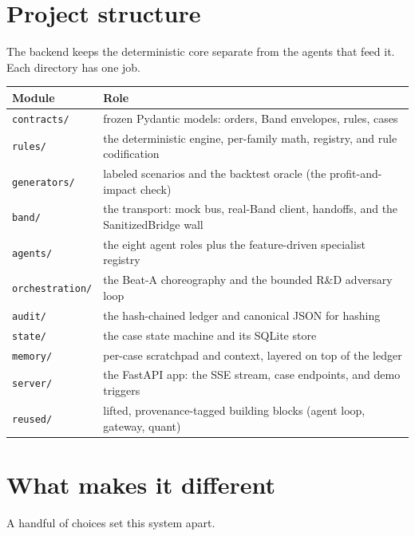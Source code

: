 \documentclass[11pt,a4paper]{article}
\begin{document}
\section{Project structure}
The backend keeps the deterministic core separate from the agents that feed it. Each directory has one job.

\begin{table}[H]\centering\small
\begin{tabular}{@{}ll@{}}
\toprule
\textbf{Module} & \textbf{Role} \\
\midrule
\texttt{contracts/} & frozen Pydantic models: orders, Band envelopes, rules, cases \\
\texttt{rules/} & the deterministic engine, per-family math, registry, and rule codification \\
\texttt{generators/} & labeled scenarios and the backtest oracle (the profit-and-impact check) \\
\texttt{band/} & the transport: mock bus, real-Band client, handoffs, and the SanitizedBridge wall \\
\texttt{agents/} & the eight agent roles plus the feature-driven specialist registry \\
\texttt{orchestration/} & the Beat-A choreography and the bounded R\&D adversary loop \\
\texttt{audit/} & the hash-chained ledger and canonical JSON for hashing \\
\texttt{state/} & the case state machine and its SQLite store \\
\texttt{memory/} & per-case scratchpad and context, layered on top of the ledger \\
\texttt{server/} & the FastAPI app: the SSE stream, case endpoints, and demo triggers \\
\texttt{reused/} & lifted, provenance-tagged building blocks (agent loop, gateway, quant) \\
\bottomrule
\end{tabular}
\end{table}

\section{What makes it different}
A handful of choices set this system apart.
\end{document}

